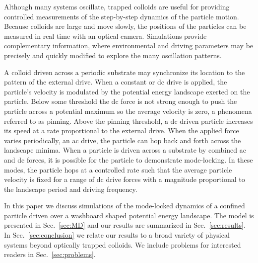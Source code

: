 \documentclass[preprint,showpacs,preprintnumbers,amsmath,amssymb,aps,prb]{revtex4-1}
\theoremstyle{remark}
\begin{document}
Although many systems oscillate,
trapped colloids are useful for 
providing controlled 
measurements of the
step-by-step dynamics of the particle motion.
Because
colloids are large 
and move slowly,  the positions of the
particles
can be measured in real time 
with an optical camera.\cite{Pertsinidis2001}
Simulations provide complementary
information,
where environmental and driving parameters may be precisely
and quickly modified to explore
the many oscillation patterns.

A colloid driven across a periodic
substrate may 
synchronize its location
to the pattern of the external drive.
When 
a constant or 
dc drive is applied,
the particle's velocity is modulated by 
the potential energy landscape exerted on the particle.   
Below some threshold  
the dc force is not strong enough to push the particle
across a potential maximum so the average velocity is zero,
a phenomena referred to as pinning.\cite{Reichhardt2017}
Above the pinning threshold,
a dc driven particle
increases its speed at a rate proportional
to the external drive.  
When the applied force varies periodically,
an ac drive,
the particle can hop back and forth across
the landscape minima.
When a particle is driven across a substrate
by combined 
ac and dc forces,
it is possible for the particle to demonstrate 
mode-locking.
In these modes,  
the particle hops at a controlled rate such that 
the average particle velocity is 
fixed for a range of dc drive forces
with a magnitude proportional to the
landscape period and driving frequency.\cite{Reichhardt2015}

In this paper we discuss simulations 
of the mode-locked dynamics
of a confined particle driven over
a washboard shaped potential energy landscape.
The model is presented in Sec.~\ref{sec:MD} and 
our results are summarized in
Sec.~\ref{sec:results}. In Sec.~\ref{sec:conclusion}
we relate  our results 
to a broad variety of physical systems beyond 
optically trapped colloids.
We include problems for interested readers 
in Sec.~\ref{sec:problems}.
\end{document}
